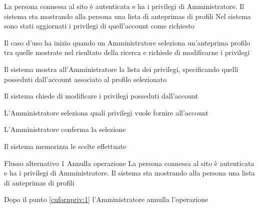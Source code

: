
{}
{La persona connessa al sito è autenticata e ha i privilegi di Amministratore. Il sistema sta mostrando alla persona una lista di \glspl{anteprima} di profili}
{Nel sistema sono stati aggiornati i privilegi di quell'account come richiesto}
{\begin{enumCU}
	\item Il caso d'uso ha inizio quando un Amministratore seleziona un'\gls{anteprima} profilo tra quelle mostrate nel risultato della ricerca e richiede di modificarne i privilegi
	\item Il sistema mostra all'Amministratore la lista dei privilegi, specificando quelli posseduti dall'account associato al profilo selezionato
	\item Il sistema chiede di modificare i privilegi posseduti dall'account
	\item L'Amministratore seleziona quali privilegi vuole fornire all'account\label{cufornpriv:1}
	\item L'Amministratore conferma la selezione
	\item Il sistema memorizza le scelte effettuate
\end{enumCU}}
%
{Flusso alternativo 1}%
{Annulla operazione}%
{La persona connessa al sito è autenticata e ha i privilegi di Amministratore. Il sistema sta mostrando alla persona una lista di \glspl{anteprima} di profili}%
{\postNulle}%
{\begin{enumCU}
		\item Dopo il punto \ref{cufornpriv:1} l'Amministratore annulla l'operazione
	\end{enumCU}}%


